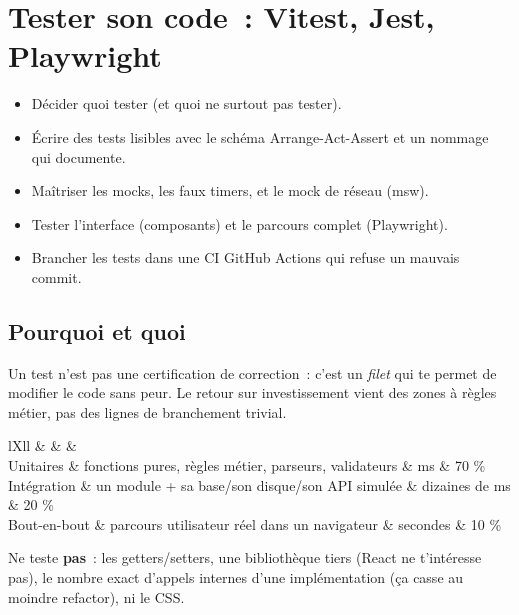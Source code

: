 \chapter{Tester son code~: Vitest, Jest, Playwright}
\label{ch-js-tests}

\begin{objectif}
\begin{itemize}
  \item D\'ecider quoi tester (et quoi ne surtout pas tester).
  \item \'Ecrire des tests lisibles avec le sch\'ema Arrange-Act-Assert et un nommage qui documente.
  \item Ma\^itriser les mocks, les faux timers, et le mock de r\'eseau (msw).
  \item Tester l'interface (composants) et le parcours complet (Playwright).
  \item Brancher les tests dans une CI GitHub Actions qui refuse un mauvais commit.
\end{itemize}
\end{objectif}

\section{Pourquoi et quoi}

Un test n'est pas une certification de correction~: c'est un \emph{filet} qui te permet de
modifier le code sans peur. Le retour sur investissement vient des zones \`a r\`egles m\'etier,
pas des lignes de branchement trivial.

\begin{tabz}{lXll}
  \headrow {} \&  \&  \&  \\
  \midrule
  Unitaires \& fonctions pures, r\`egles m\'etier, parseurs, validateurs \& ms \& 70 \% \\
  Int\'egration \& un module + sa base/son disque/son API simul\'ee \& dizaines de ms \& 20 \% \\
  Bout-en-bout \& parcours utilisateur r\'eel dans un navigateur \& secondes \& 10 \% \\
\end{tabz}

Ne teste \textbf{pas}~: les getters/setters, une biblioth\`eque tiers (React ne t'int\'eresse pas),
le nombre exact d'appels internes d'une impl\'ementation (\c{c}a casse au moindre refactor), ni le CSS.

